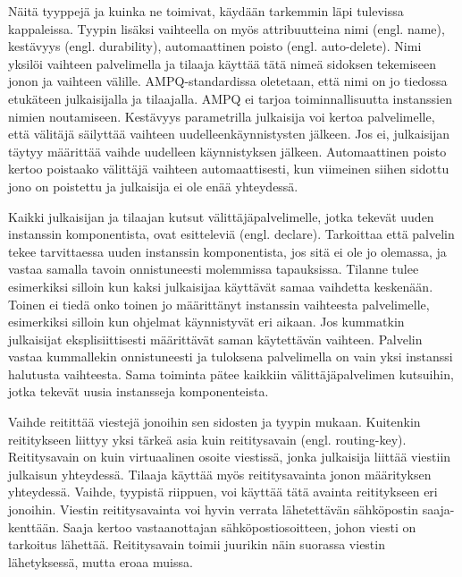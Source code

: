 Näitä tyyppejä ja kuinka ne toimivat, käydään tarkemmin läpi tulevissa kappaleissa. Tyypin lisäksi vaihteella on myös attribuutteina nimi (engl. name), kestävyys (engl. durability), automaattinen poisto (engl. auto-delete). Nimi yksilöi vaihteen palvelimella ja tilaaja käyttää tätä nimeä sidoksen tekemiseen jonon ja vaihteen välille. AMPQ-standardissa oletetaan, että nimi on jo tiedossa etukäteen julkaisijalla ja tilaajalla. AMPQ ei tarjoa toiminnallisuutta instanssien nimien noutamiseen. Kestävyys parametrilla julkaisija voi kertoa palvelimelle, että välitäjä säilyttää vaihteen uudelleenkäynnistysten jälkeen. Jos ei, julkaisijan täytyy määrittää vaihde uudelleen käynnistyksen jälkeen. Automaattinen poisto kertoo poistaako välittäjä vaihteen automaattisesti, kun viimeinen siihen sidottu jono on poistettu ja julkaisija ei ole enää yhteydessä.

Kaikki julkaisijan ja tilaajan kutsut välittäjäpalvelimelle, jotka tekevät uuden instanssin komponentista, ovat esitteleviä (engl. declare). Tarkoittaa että palvelin tekee tarvittaessa uuden instanssin komponentista, jos sitä ei ole jo olemassa, ja vastaa samalla tavoin onnistuneesti molemmissa tapauksissa. Tilanne tulee esimerkiksi silloin kun kaksi julkaisijaa käyttävät samaa vaihdetta keskenään. Toinen ei tiedä onko toinen jo määrittänyt instanssin vaihteesta palvelimelle, esimerkiksi silloin kun ohjelmat käynnistyvät eri aikaan. Jos kummatkin julkaisijat eksplisiittisesti määrittävät saman käytettävän vaihteen. Palvelin vastaa kummallekin onnistuneesti ja tuloksena palvelimella on vain yksi instanssi halutusta vaihteesta. Sama toiminta pätee kaikkiin välittäjäpalvelimen kutsuihin, jotka tekevät uusia instansseja komponenteista.

Vaihde reitittää viestejä jonoihin sen sidosten ja tyypin mukaan. Kuitenkin reititykseen liittyy yksi tärkeä asia kuin reititysavain (engl. routing-key). Reititysavain on kuin virtuaalinen osoite viestissä, jonka julkaisija liittää viestiin julkaisun yhteydessä. Tilaaja käyttää myös reititysavainta jonon määrityksen yhteydessä. Vaihde, tyypistä riippuen, voi käyttää tätä avainta reititykseen eri jonoihin. Viestin reititysavainta voi hyvin verrata lähetettävän sähköpostin saaja-kenttään. Saaja kertoo vastaanottajan sähköpostiosoitteen, johon viesti on tarkoitus lähettää. Reititysavain toimii juurikin näin suorassa viestin lähetyksessä, mutta eroaa muissa.


